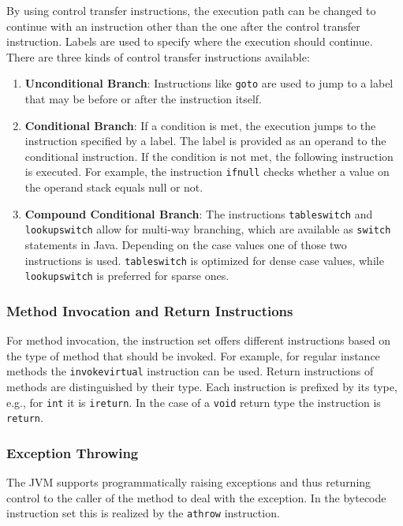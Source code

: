 By using control transfer instructions, the execution path can be changed to continue with an instruction other than the one after the control transfer instruction. Labels are used to specify where the execution should continue. There are three kinds of control transfer instructions available:

\begin{enumerate}
    \item \textbf{Unconditional Branch}: Instructions like \texttt{goto} are used to jump to a label that may be before or after the instruction itself. 
    \item \textbf{Conditional Branch}: If a condition is met, the execution jumps to the instruction specified by a label. The label is provided as an operand to the conditional instruction. If the condition is not met, the following instruction is executed. For example, the instruction \texttt{ifnull} checks whether a value on the operand stack equals null or not.
    \item \textbf{Compound Conditional Branch}: The instructions \texttt{tableswitch} and \break \texttt{lookupswitch} allow for multi-way branching, which are available as \texttt{switch} statements in Java. Depending on the case values one of those two instructions is used. \texttt{tableswitch} is optimized for dense case values, while \texttt{lookupswitch} is preferred for sparse ones.
    
\end{enumerate}

\subsubsection{Method Invocation and Return Instructions}

For method invocation, the instruction set offers different instructions based on the type of method that should be invoked. For example, for regular instance methods the \texttt{invokevirtual} instruction can be used. Return instructions of methods are distinguished by their type. Each instruction is prefixed by its type, e.g., for \texttt{int} it is \texttt{ireturn}. In the case of a \texttt{void} return type the instruction is \texttt{return}. 

\subsubsection{Exception Throwing}

The JVM supports programmatically raising exceptions and thus returning control to the caller of the method to deal with the exception. In the bytecode instruction set this is realized by the \texttt{athrow} instruction.  

